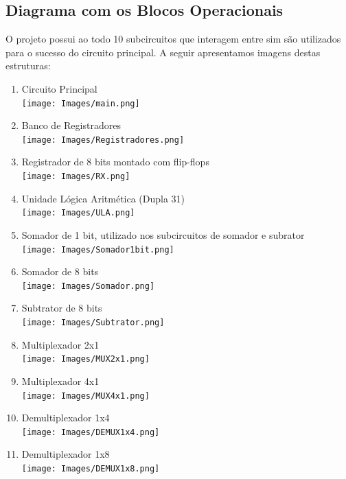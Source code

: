 \documentclass[]{article}
\begin{document}
	\subsection{Diagrama com os Blocos Operacionais}
		O projeto possui ao todo 10 subcircuitos que interagem entre sim são utilizados para o sucesso do circuito principal. A seguir apresentamos imagens destas estruturas:
		\begin{enumerate}
		
		\item Circuito Principal\\
		\texttt{[image: Images/main.png]}\\
		\item Banco de Registradores\\
		\texttt{[image: Images/Registradores.png]}\\
		\newpage
		\item Registrador de 8 bits montado com flip-flops\\
		\texttt{[image: Images/RX.png]}\\
		\item Unidade Lógica Aritmética (Dupla 31)\\
		\texttt{[image: Images/ULA.png]}\\
		\item Somador de 1 bit, utilizado nos subcircuitos de somador e subrator\\
		\texttt{[image: Images/Somador1bit.png]}\\
		\item Somador de 8 bits\\
		\texttt{[image: Images/Somador.png]}\\
		\item Subtrator de 8 bits\\
		\texttt{[image: Images/Subtrator.png]}\\
		\newpage
		\item Multiplexador 2x1\\
		\texttt{[image: Images/MUX2x1.png]}\\
		\item Multiplexador 4x1\\
		\texttt{[image: Images/MUX4x1.png]}\\
		\item Demultiplexador 1x4\\
		\texttt{[image: Images/DEMUX1x4.png]}\\
		\item Demultiplexador 1x8\\
		\texttt{[image: Images/DEMUX1x8.png]}\\

		\end{enumerate}
\end{document}
